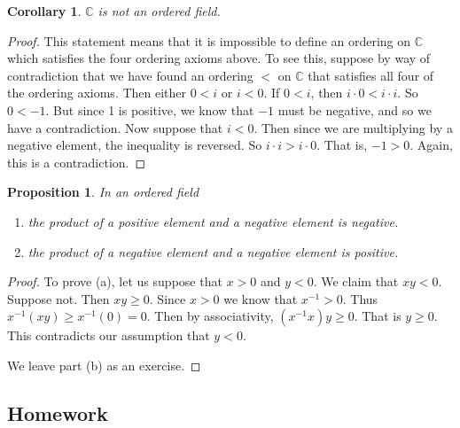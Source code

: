 \documentclass[11pt]{article}
\newtheorem{proposition}[theorem]{Proposition}
\newtheorem{corollary}[theorem]{Corollary}
\theoremstyle{definition}
\begin{document}
\begin{corollary}
  $\mathbb{C}$ is not an ordered field.
\end{corollary}
\begin{proof}
  This statement means that it is impossible to define an ordering on $\mathbb{C}$ which satisfies the four ordering axioms above. To see this, suppose
  by way of contradiction that we have found an ordering $<$ on $\mathbb{C}$ that satisfies all four of the ordering axioms. Then either $0< i$ or $i < 0$.
  If $0 < i$, then $i\cdot 0 < i\cdot i$. So $0 < -1$. But since 1 is positive, we know that $-1$ must be negative, and so we have a contradiction.
  Now suppose that $i < 0$. Then since we are multiplying by a negative element, the inequality is reversed. So $i\cdot i > i\cdot 0$. That is, 
  $-1 > 0$. Again, this is a contradiction.
\end{proof}

\begin{proposition} In an ordered field
  \begin{enumerate}
    \item[(a)] the product of a positive element and a negative element is negative.
    \item[(b)] the product of a negative element and a negative element is positive.
  \end{enumerate}
\end{proposition}
\begin{proof}
  To prove (a), let us suppose that $x > 0$ and $y < 0$. We claim that $xy < 0$. Suppose not. Then $xy \geq 0$. Since $x > 0$ we know that
  $x^{-1} > 0$. Thus $x^{-1}(xy) \geq x^{-1}(0) = 0$. Then by associativity, $(x^{-1}x)y \geq 0$. That is $y \geq 0$. This 
  contradicts our assumption that $y < 0$.

  We leave part (b) as an exercise.
\end{proof}


\newpage \subsection{Homework}  
\end{document}
